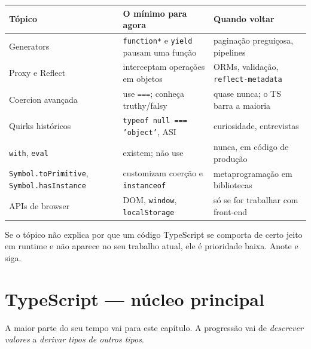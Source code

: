 \documentclass[12pt,a4paper,oneside]{book}
\newcommand{\code}[1]{\texttt{#1}}
\begin{document}
{\small
\begin{tabularx}{\textwidth}{@{}lXX@{}}
\toprule
\textbf{Tópico} & \textbf{O mínimo para agora} & \textbf{Quando voltar} \\
\midrule
Generators & \code{function*} e \code{yield} pausam uma função & paginação preguiçosa, pipelines \\
Proxy e Reflect & interceptam operações em objetos & ORMs, validação, \code{reflect-metadata} \\
Coercion avançada & use \code{===}; conheça truthy/falsy & quase nunca; o TS barra a maioria \\
Quirks históricos & \code{typeof null === 'object'}, ASI & curiosidade, entrevistas \\
\code{with}, \code{eval} & existem; não use & nunca, em código de produção \\
\code{Symbol.toPrimitive}, \code{Symbol.hasInstance} & customizam coerção e \code{instanceof} & metaprogramação em bibliotecas \\
APIs de browser & DOM, \code{window}, \code{localStorage} & só se for trabalhar com front-end \\
\bottomrule
\end{tabularx}
}

\begin{nota}
Se o tópico não explica por que um código TypeScript se comporta de certo jeito em runtime e não aparece no seu trabalho atual, ele é prioridade baixa. Anote e siga.
\end{nota}

\chapter{TypeScript --- núcleo principal}
\label{cap:tsnucleo}

A maior parte do seu tempo vai para este capítulo. A progressão vai de \emph{descrever valores} a \emph{derivar tipos de outros tipos}.
\end{document}
